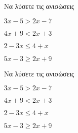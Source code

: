 Να λύσετε τις ανισώσεις
\begin{alist}
\item $ 3x-5>2x-7 $
\item $ 4x+9<2x+3 $
\item $ 2-3x\leq 4+x $
\item $ 5x-3\geq 2x+9 $
\end{alist}
Να λύσετε τις ανισώσεις
\begin{alist}
\item $ 3x-5>2x-7 $
\item $ 4x+9<2x+3 $
\item $ 2-3x\leq 4+x $
\item $ 5x-3\geq 2x+9 $
\end{alist}
